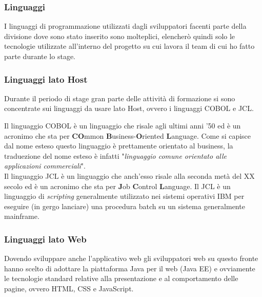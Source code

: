 	\subsubsection{Linguaggi}
	
	I linguaggi di programmazione utilizzati dagli sviluppatori facenti parte della divisione dove sono stato inserito sono molteplici, elencherò quindi solo le tecnologie utilizzate all'interno del progetto su cui lavora il team di cui ho fatto parte durante lo stage.
		
	\subsubsection{Linguaggi lato Host}
	Durante il periodo di stage gran parte delle attività di formazione si sono concentrate sui linguaggi da usare lato Host, ovvero i linguaggi COBOL e JCL.
	
	Il linguaggio COBOL è un linguaggio che risale agli ultimi anni '50 ed è un acronimo che sta per \textbf{CO}mmon \textbf{B}usiness-\textbf{O}riented \textbf{L}anguage. Come si capisce dal nome esteso questo linguaggio è prettamente orientato al business, la traduezione del nome esteso è infatti "\textit{linguaggio comune orientato alle applicazioni commerciali}".\\

	Il linguaggio JCL è un linguaggio che anch'esso risale alla seconda metà del XX secolo ed è un acronimo che sta per \textbf{J}ob \textbf{C}ontrol \textbf{L}anguage. Il JCL è un linguaggio di \textit{scripting} generalmente utilizzato nei sistemi operativi IBM per eseguire (in gergo lanciare) una procedura batch su un sistema generalmente mainframe.

	\subsubsection{Linguaggi lato Web}

	Dovendo sviluppare anche l'applicativo web gli sviluppatori web su questo
fronte hanno scelto di adottare la piattaforma Java per il web (Java EE) e ovviamente le tecnologie standard relative alla presentazione e al comportamento delle pagine, ovvero HTML, CSS e JavaScript.\\

